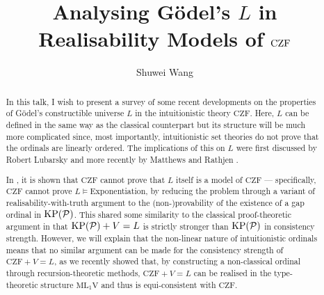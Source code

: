 \documentclass{llncs}
\title{Analysing G\"odel's $L$ in Realisability Models of $\CZF$}
\author{Shuwei Wang\inst{1}\orcidID{0000-0001-7470-8018}}
\institute{University of Leeds, England, UK}
\newcommand{\CZF}{\mathrm{CZF}}
\newcommand{\KPP}{\mathrm{KP}\mleft(\mathcal{P}\mright)}
\newcommand{\MLV}{\mathrm{ML}_1\mathrm{V}}
\begin{document}
\maketitle

\begin{abstract}
  In this talk, I wish to present a survey of some recent developments on the properties of G\"odel's constructible universe $L$ in the intuitionistic theory $\CZF$. Here, $L$ can be defined in the same way as the classical counterpart but its structure will be much more complicated since, most importantly, intuitionistic set theories do not prove that the ordinals are linearly ordered. The implications of this on $L$ were first discussed by Robert Lubarsky \cite{lubarsky93-intuitionistic-l} and more recently by Matthews and Rathjen \cite{matthews-rathjen24-constructible-universe}.

  In \cite{matthews-rathjen24-constructible-universe}, it is shown that $\CZF$ cannot prove that $L$ itself is a model of $\CZF$ --- specifically, $\CZF$ cannot prove $L \vDash {}$Exponentiation, by reducing the problem through a variant of realisability-with-truth argument to the (non-)provability of the existence of a gap ordinal in $\KPP$. This shared some similarity to the classical proof-theoretic argument in \cite{rathjen20-power-kp-choice} that $\KPP + V = L$ is strictly stronger than $\KPP$ in consistency strength. However, we will explain that the non-linear nature of intuitionistic ordinals means that no similar argument can be made for the consistency strength of $\CZF + V = L$, as we recently showed that, by constructing a non-classical ordinal through recursion-theoretic methods, $\CZF + V = L$ can be realised in the type-theoretic structure $\MLV$ and thus is equi-consistent with $\CZF$.
\end{abstract}



\end{document}
